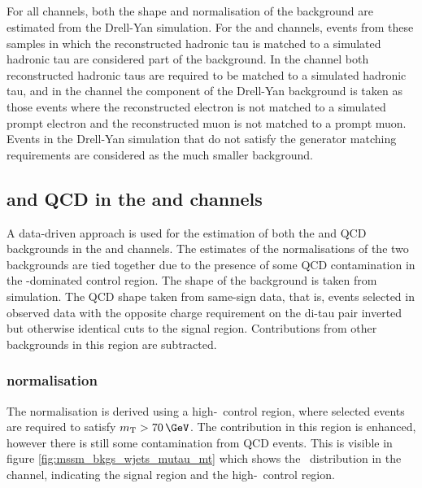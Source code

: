 \subsection{\texorpdfstring{\Ztautau}{Z to tau tau}}
\label{sec:mssm_bkgs_ztt}
For all channels, both the shape and normalisation of the \Ztautau background 
are estimated from the Drell-Yan
simulation.
For the \mutau and \etau channels, events from these samples 
in which the reconstructed hadronic tau is matched to 
a simulated hadronic tau are considered part of the \Ztautau
background. In the \tautau channel both reconstructed
hadronic taus are required to be matched to a simulated hadronic tau, and
in the \emu channel the \Ztautau component of the Drell-Yan background 
is taken as those events where the reconstructed electron is not matched to
a simulated prompt electron and the reconstructed
muon is not matched to a prompt muon. 
Events in the Drell-Yan simulation 
that do not satisfy the generator matching requirements are considered
as the much smaller \Zll background.

\subsection{\texorpdfstring{\Wjets and QCD in the \etau and \mutau channels}{W+jets and QCD in the e tau and mu tau channels}}
\label{sec:mssm_bkgs_mtet_wjetsqcd}
A data-driven approach is used for the estimation of
both the \Wjets and QCD backgrounds in the \etau and \mutau channels. 
The estimates of the normalisations of the two backgrounds are tied
together due to the presence of some QCD contamination in the \Wjets-dominated
control region. The shape of the \Wjets background is taken
from simulation. The QCD shape taken from same-sign
data, that is, events selected in observed data with the opposite charge requirement
on the di-tau pair inverted but otherwise identical cuts to the signal region. Contributions
from other backgrounds in this region are subtracted.

\subsubsection{\texorpdfstring{\Wjets normalisation}{W+jets normalisation}}
\label{sec:mssm_bkgs_mtet_wjetsnorm}
The \Wjets normalisation is derived using a high-\mT~control region, where
selected events are required to satisfy $\mTm>70\,\GeV$. The 
\Wjets
contribution in this region is enhanced, however there is still
some contamination from QCD events. This is visible in 
figure \ref{fig:mssm_bkgs_wjets_mutau_mt} which shows the \mT~distribution in the
\mutau channel, indicating the signal region and the high-\mT~control region. 

